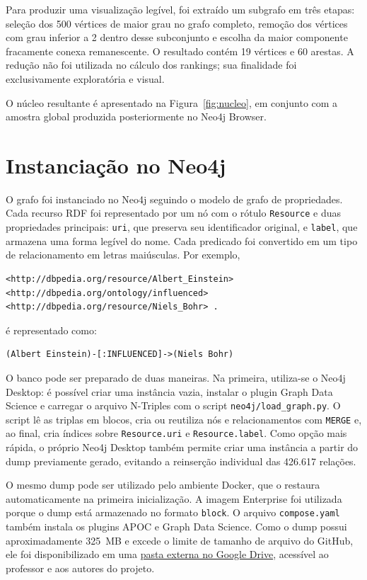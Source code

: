 \documentclass[10pt,a4paper]{article}
\begin{document}
Para produzir uma visualização legível, foi extraído um subgrafo em três etapas: seleção dos 500 vértices de maior grau no grafo completo, remoção dos vértices com grau inferior a 2 dentro desse subconjunto e escolha da maior componente fracamente conexa remanescente. O resultado contém 19 vértices e 60 arestas. A redução não foi utilizada no cálculo dos rankings; sua finalidade foi exclusivamente exploratória e visual.

O núcleo resultante é apresentado na Figura~\ref{fig:nucleo}, em conjunto com a amostra global produzida posteriormente no Neo4j Browser.

\section{Instanciação no Neo4j}

O grafo foi instanciado no Neo4j seguindo o modelo de grafo de propriedades. Cada recurso RDF foi representado por um nó com o rótulo \texttt{Resource} e duas propriedades principais: \texttt{uri}, que preserva seu identificador original, e \texttt{label}, que armazena uma forma legível do nome. Cada predicado foi convertido em um tipo de relacionamento em letras maiúsculas. Por exemplo,

\begin{lstlisting}
<http://dbpedia.org/resource/Albert_Einstein>
<http://dbpedia.org/ontology/influenced>
<http://dbpedia.org/resource/Niels_Bohr> .
\end{lstlisting}

é representado como:

\begin{lstlisting}
(Albert Einstein)-[:INFLUENCED]->(Niels Bohr)
\end{lstlisting}

O banco pode ser preparado de duas maneiras. Na primeira, utiliza-se o Neo4j Desktop: é possível criar uma instância vazia, instalar o plugin Graph Data Science e carregar o arquivo N-Triples com o script \texttt{neo4j/load\_graph.py}. O script lê as triplas em blocos, cria ou reutiliza nós e relacionamentos com \texttt{MERGE} e, ao final, cria índices sobre \texttt{Resource.uri} e \texttt{Resource.label}. Como opção mais rápida, o próprio Neo4j Desktop também permite criar uma instância a partir do dump previamente gerado, evitando a reinserção individual das 426.617 relações.

O mesmo dump pode ser utilizado pelo ambiente Docker, que o restaura automaticamente na primeira inicialização. A imagem Enterprise foi utilizada porque o dump está armazenado no formato \texttt{block}. O arquivo \texttt{compose.yaml} também instala os plugins APOC e Graph Data Science. Como o dump possui aproximadamente 325~MB e excede o limite de tamanho de arquivo do GitHub, ele foi disponibilizado em uma \href{https://drive.google.com/drive/folders/1s8zgb1wgWI-WAhUEZvB0qDljOAyWN4BZ?usp=sharing}{pasta externa no Google Drive}, acessível ao professor e aos autores do projeto.
\end{document}
